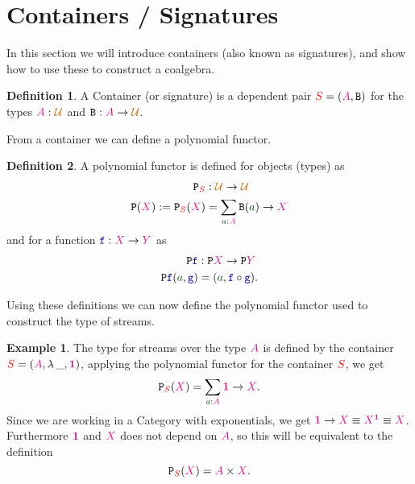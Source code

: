 \documentclass[twoside,11pt,openright]{report}
\theoremstyle{plain} %
\theoremstyle{definition}
\newtheorem{defn}{Definition}[section]
\newtheorem{exmp}{Example}[section]
\theoremstyle{remark}
\newcommand*{\term}[1]{\textcolor{green!30!black}{#1}} %
\newcommand*{\type}[1]{\textcolor{magenta!90!black}{#1}}
\newcommand*{\container}[1]{\textcolor{red}{#1}}
\newcommand*{\universe}[1]{\textcolor{orange!80!black}{#1}}
\newcommand*{\unit}{\type{\textbf{1}}}
\newcommand*{\function}[1]{\textcolor{blue!60!black}{\ensuremath{\mathtt{#1}}}}
\newcommand*{\typeformer}[1]{\ensuremath{\mathtt{#1}}}
\newcommand*{\functor}[1]{\ensuremath{\mathbf{\mathtt{#1}}}}
\begin{document}
\section{Containers / Signatures}
In this section we will introduce containers (also known as signatures), and show how to use these to construct a coalgebra. 
\begin{defn}
  A Container (or signature) is a dependent pair \(\container{S} = (\type{A},\typeformer{B})\) for the types \(\type{A} : \universe{\mathcal{U}}\) and \(\typeformer{B} : \type{A} \rightarrow \universe{\mathcal{U}}\).
\end{defn}
\noindent From a container we can define a polynomial functor.
\begin{defn}
  A polynomial functor is defined for objects (types) as
  \begin{equation}
    \begin{aligned}
      \functor{P}_{\container{S}} &: \universe{\mathcal{U}} \rightarrow \universe{\mathcal{U}} \\
      \functor{P}(\type{X}) := \functor{P}_{\container{S}}(\type{X}) &= \sum_{\term{a} : \type{A}} \typeformer{B}(\term{a}) \rightarrow \type{X}
    \end{aligned}
  \end{equation}
  and for a function \(\function{f} : \type{X} \rightarrow \type{Y}\) as
  \begin{equation}
    \begin{aligned}
      \functor{P}\function{f} &: \functor{P}\type{X} \rightarrow \functor{P}\type{Y} \\
      \functor{P}\function{f}(\term{a},\function{g}) &= (\term{a}, \function{f} \circ \function{g}).
    \end{aligned}
  \end{equation}
\end{defn}
\noindent Using these definitions we can now define the polynomial functor used to construct the type of streams.
\begin{exmp}
  The type for streams over the type \(\type{A}\) is defined by the container \(\container{S} = (\type{A},\lambda\,\_, \unit)\), applying the polynomial functor for the container \(\container{S}\), we get
  \begin{equation}
    \functor{P}_{\container{S}}(\type{X}) = \sum_{\term{a} : \type{A}} \unit \rightarrow \type{X}.
  \end{equation}
  Since we are working in a Category with exponentials, we get \(\unit \rightarrow \type{X} \equiv \type{X}^{\unit} \equiv \type{X}\). Furthermore \(\unit\) and \(\type{X}\) does not depend on \(\type{A}\), so this will be equivalent to the definition
  \begin{equation}
    \functor{P}_{\container{S}}(\type{X}) = \type{A} \times \type{X}.
  \end{equation}
\end{exmp}
\end{document}

